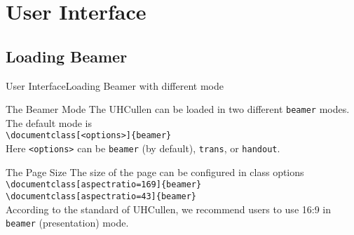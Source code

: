 \documentclass[10pt,xcolor={dvipsnames},aspectratio=169]{beamer}
\begin{document}
\section{User Interface}
\subsection{Loading Beamer}
\begin{frame}{User Interface}{Loading Beamer with different mode}
  \vspace{-0.5em}
  \begin{block}{The Beamer Mode}
    \small
    The UHCullen can be loaded in two different \texttt{beamer} modes. The default mode is\\
    {\tt \textbackslash documentclass[<options>]\{beamer\}}\\
    Here \texttt{<options>} can be \texttt{beamer} (by default), \texttt{trans}, or \texttt{handout}.
  \end{block}
  \begin{block}{The Page Size}
    \small
    The size of the page can be configured in class options\\
    {\tt \textbackslash documentclass[aspectratio=169]\{beamer\}}\\
    {\tt \textbackslash documentclass[aspectratio=43]\{beamer\}}\\
    According to the standard of UHCullen, we recommend users to use 16:9 in \texttt{beamer} (presentation) mode.
  \end{block}
\end{frame}


\end{document}
